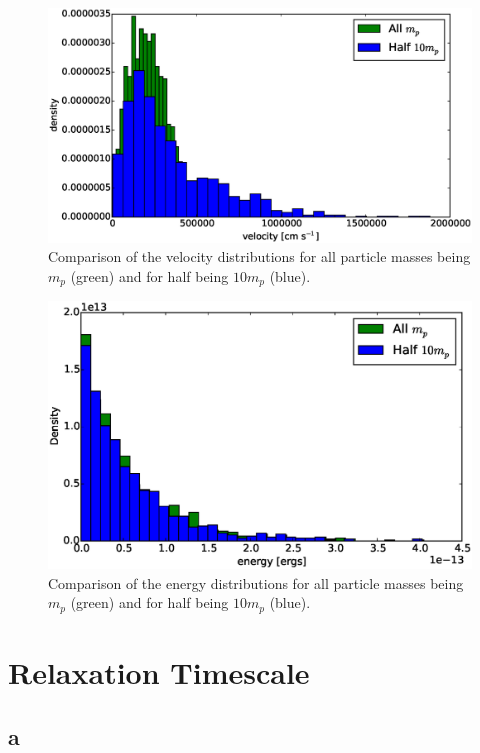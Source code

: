 \documentclass[12pt]{amsart}
\begin{document}
\begin{figure}[h!]
  \centering
    \includegraphics[width=1.0\textwidth]{vel_comp.eps}
    \caption{Comparison of the velocity distributions for all particle masses being $m_p$ (green) and for half being $10m_p$ (blue).}
\end{figure}

\begin{figure}[h!]
  \centering
    \includegraphics[width=1.0\textwidth]{energy_comp.eps}
    \caption{Comparison of the energy distributions for all particle masses being $m_p$ (green) and for half being $10m_p$ (blue).}
\end{figure}


\section{Relaxation Timescale}

\subsection{a}
\end{document}
